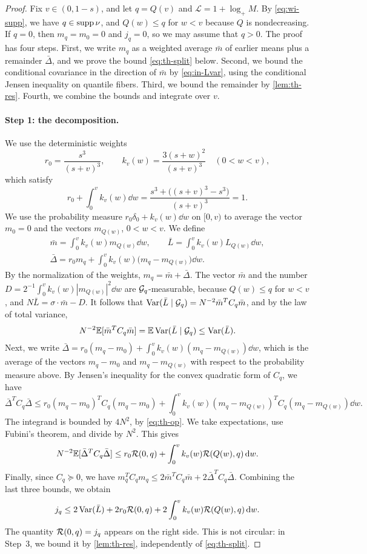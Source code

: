 \begin{proof}
Fix $v\in(0,1-s)$, and let $q=Q(v)$ and $\mathcal L=1+\log_+M$. By
\eqref{eq:wi-supp}, we have $q\in\operatorname{supp}\nu$, and $Q(w)\le q$ for $w<v$
because $Q$ is nondecreasing. If $q=0$, then $m_q=m_0=0$ and $j_q=0$, so
we may assume that $q>0$. The proof has four steps. First, we write
$m_q$ as a weighted average $\bar m$ of earlier means plus a remainder
$\bar\Delta$, and we prove the bound \eqref{eq:th-split} below. Second,
we bound the conditional covariance in the direction of $\bar m$ by
\eqref{eq:in-Lvar},
using the conditional Jensen inequality on quantile fibers. Third, we
bound the remainder by \cref{lem:th-res}. Fourth, we combine the bounds
and integrate over $v$.

\paragraph{Step 1: the decomposition.}
We use the deterministic weights
\[
 r_0=\frac{s^3}{(s+v)^3},\qquad
 k_v(w)=\frac{3(s+w)^2}{(s+v)^3}\quad(0<w<v),
\]
which satisfy
\[
 r_0+\int_0^vk_v(w)\dd w=\frac{s^3+\bigl((s+v)^3-s^3\bigr)}{(s+v)^3}=1 .
\]
We use the probability measure $r_0\delta_0+k_v(w)\dd w$ on $[0,v)$ to
average the vector $m_0=0$ and the vectors $m_{Q(w)}$, $0<w<v$. We define
\[
 \begin{gathered}
 \bar m=\int_0^vk_v(w)m_{Q(w)}\dd w,\qquad
 \bar L=\int_0^vk_v(w)L_{Q(w)}\dd w,\\
 \bar\Delta=r_0m_q+\int_0^vk_v(w)\bigl(m_q-m_{Q(w)}\bigr)\dd w.
 \end{gathered}
\]
By the normalization of the weights, $m_q=\bar m+\bar\Delta$. The vector
$\bar m$ and the number $D=2^{-1}\int_0^vk_v(w)|m_{Q(w)}|^2\dd w$ are
$\mathcal G_q$-measurable, because $Q(w)\le q$ for $w<v$, and
$N\bar L=\sigma\cdot\bar m-D$. It follows that
$\operatorname{Var}(\bar L\mid\mathcal G_q)=N^{-2}\bar m^TC_q\bar m$, and by the law of
total variance,
\[
 N^{-2}\mathbb E[\bar m^TC_q\bar m]=\mathbb E\operatorname{Var}(\bar L\mid\mathcal G_q)\le\operatorname{Var}(\bar L).
\]
Next, we write
$\bar\Delta=r_0(m_q-m_0)+\int_0^vk_v(w)(m_q-m_{Q(w)})\dd w$, which is
the average of the vectors $m_q-m_0$ and $m_q-m_{Q(w)}$ with respect to
the probability measure above. By Jensen's inequality for the
convex quadratic form of $C_q$, we have
\[
 \bar\Delta^TC_q\bar\Delta
 \le r_0(m_q-m_0)^TC_q(m_q-m_0)
 +\int_0^vk_v(w)(m_q-m_{Q(w)})^TC_q(m_q-m_{Q(w)})\dd w .
\]
The integrand is bounded by $4N^2$, by \eqref{eq:th-op}. We take
expectations, use Fubini's theorem, and divide by $N^2$. This gives
\[
 N^{-2}\mathbb E[\bar\Delta^TC_q\bar\Delta]
 \le r_0\mathcal R(0,q)+\int_0^vk_v(w)\mathcal R(Q(w),q)\,\mathrm d w .
\]
Finally, since $C_q\succeq0$, we have
$m_q^TC_qm_q\le2\bar m^TC_q\bar m+2\bar\Delta^TC_q\bar\Delta$. Combining
the last three bounds, we obtain
\begin{equation}\label{eq:th-split}
 j_q\le2\operatorname{Var}(\bar L)
       +2r_0\mathcal R(0,q)+2\int_0^v k_v(w)\mathcal R(Q(w),q)\,\mathrm d w.
\end{equation}
The quantity $\mathcal R(0,q)=j_q$ appears on the right side. This is not
circular: in Step~3, we bound it by \cref{lem:th-res}, independently of
\eqref{eq:th-split}.


\end{proof}
